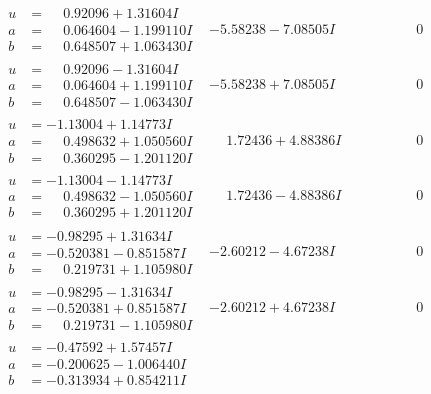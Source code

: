 \documentclass[1p]{elsarticle_modified}
\theoremstyle{definition}
\begin{document}
$$\begin{array}{c|c|c}
\begin{aligned}
u &= \phantom{-}0.92096 + 1.31604 I \\
a &= \phantom{-}0.064604 - 1.199110 I \\
b &= \phantom{-}0.648507 + 1.063430 I\end{aligned}
 & -5.58238 - 7.08505 I & \phantom{-0.000000 } 0 \\ \hline\begin{aligned}
u &= \phantom{-}0.92096 - 1.31604 I \\
a &= \phantom{-}0.064604 + 1.199110 I \\
b &= \phantom{-}0.648507 - 1.063430 I\end{aligned}
 & -5.58238 + 7.08505 I & \phantom{-0.000000 } 0 \\ \hline\begin{aligned}
u &= -1.13004 + 1.14773 I \\
a &= \phantom{-}0.498632 + 1.050560 I \\
b &= \phantom{-}0.360295 - 1.201120 I\end{aligned}
 & \phantom{-}1.72436 + 4.88386 I & \phantom{-0.000000 } 0 \\ \hline\begin{aligned}
u &= -1.13004 - 1.14773 I \\
a &= \phantom{-}0.498632 - 1.050560 I \\
b &= \phantom{-}0.360295 + 1.201120 I\end{aligned}
 & \phantom{-}1.72436 - 4.88386 I & \phantom{-0.000000 } 0 \\ \hline\begin{aligned}
u &= -0.98295 + 1.31634 I \\
a &= -0.520381 - 0.851587 I \\
b &= \phantom{-}0.219731 + 1.105980 I\end{aligned}
 & -2.60212 - 4.67238 I & \phantom{-0.000000 } 0 \\ \hline\begin{aligned}
u &= -0.98295 - 1.31634 I \\
a &= -0.520381 + 0.851587 I \\
b &= \phantom{-}0.219731 - 1.105980 I\end{aligned}
 & -2.60212 + 4.67238 I & \phantom{-0.000000 } 0 \\ \hline\begin{aligned}
u &= -0.47592 + 1.57457 I \\
a &= -0.200625 - 1.006440 I \\
b &= -0.313934 + 0.854211 I\end{aligned}

\end{array}$$
\end{document}
